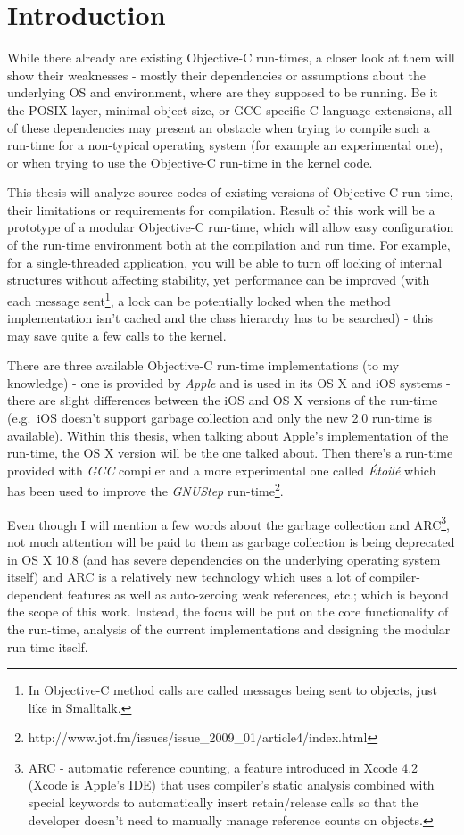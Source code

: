 \chapter*{Introduction}

While there already are existing Objective-C run-times, a closer look at them will show their weaknesses - mostly their dependencies or assumptions about the underlying OS and environment, where are they supposed to be running. Be it the POSIX layer, minimal object size, or GCC-specific C language extensions, all of these dependencies may present an obstacle when trying to compile such a run-time for a non-typical operating system (for example an experimental one), or when trying to use the Objective-C run-time in the kernel code.

This thesis will analyze source codes of existing versions of Objective-C run-time, their limitations or requirements for compilation. Result of this work will be a prototype of a modular Objective-C run-time, which will allow easy configuration of the run-time environment both at the compilation and run time. For example, for a single-threaded application, you will be able to turn off locking of internal structures without affecting stability, yet performance can be improved (with each message sent\footnote{In Objective-C method calls are called messages being sent to objects, just like in Smalltalk.}, a lock can be potentially locked when the method implementation isn't cached and the class hierarchy has to be searched) - this may save quite a few calls to the kernel.

There are three available Objective-C run-time implementations (to my knowledge) - one is provided by \emph{Apple} and is used in its OS X and iOS systems - there are slight differences between the iOS and OS X versions of the run-time (e.g.\ iOS doesn't support garbage collection and only the new 2.0 run-time is available). Within this thesis, when talking about Apple's implementation of the run-time, the OS X version will be the one talked about. Then there's a run-time provided with \emph{GCC} compiler and a more experimental one called \emph{\'{E}toil\'{e}} which has been used to improve the \emph{GNUStep} run-time\footnote{http://www.jot.fm/issues/issue\_2009\_01/article4/index.html}.

Even though I will mention a few words about the garbage collection and ARC\footnote{ARC - automatic reference counting, a feature introduced in Xcode 4.2 (Xcode is Apple's IDE) that uses compiler's static analysis combined with special keywords to automatically insert retain/release calls so that the developer doesn't need to manually manage reference counts on objects.}, not much attention will be paid to them as garbage collection is being deprecated in OS X 10.8 (and has severe dependencies on the underlying operating system itself) and ARC is a relatively new technology which uses a lot of compiler-dependent features as well as auto-zeroing weak references, etc.; which is beyond the scope of this work. Instead, the focus will be put on the core functionality of the run-time, analysis of the current implementations and designing the modular run-time itself.